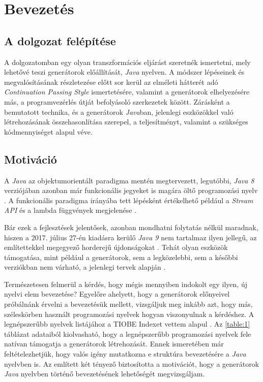 \chapter{Bevezetés}

\section{A dolgozat felépítése}

A dolgozatomban egy olyan transzformációs eljárást szeretnék ismertetni, mely lehetővé teszi generátorok előállítását, \textit{Java} nyelven. A módszer lépéseinek és megvalósításának részletezése előtt sor kerül az elméleti hátterét adó \textit{Continuation Passing Style} ismertetésére, valamint a generátorok elhelyezésére más, a programvezérlés útját befolyásoló szerkezetek között. Zárásként a bemutatott technika, és a generátorok \textit{Java}ban, jelenlegi eszközökkel való létrehozásának összehasonlítása szerepel, a teljesítményt, valamint a szükséges kódmennyiséget alapul véve.

\section{Motiváció}

A \textit{Java} az objektumorientált paradigma mentén megtervezett, legutóbbi, \textit{Java 8} verziójában azonban már funkcionális jegyeket is magára öltő programozási nyelv . A funkcionális paradigma irányába tett lépésként értékelhető például a \textit{Stream API} és a lambda függvények megjelenése \cite{Java8Features}. 

Bár ezek a fejlesztések jelentősek, azonban mondhatni folytatás nélkül maradnak, hiszen a 2017. július 27-én kiadásra kerülő \textit{Java 9} nem tartalmaz ilyen jellegű, az említettekkel megegyező horderejű újdonságokat \cite{Java9Features}. Tehát olyan eszközök támogatása, mint például a generátorok, sem a legközelebbi, sem a későbbi verziókban nem várható, a jelenlegi tervek alapján \cite{ProjectValhalla}.

Természetesen felmerül a kérdés, hogy mégis mennyiben indokolt egy ilyen, új nyelvi elem bevezetése? Egyelőre ahelyett, hogy a generátorok előnyeivel próbálnánk érvelni a bevezetésük mellett, vizsgáljuk meg inkább azt, hogy más, széleskörben használt programozási nyelvek hogyan viszonyulnak a kérdéshez. A legnépszerűbb nyelvek listájához a TIOBE Indexet vettem alapul \cite{TIOBEIndex}. Az \ref{table:1} táblázat adataiból kiolvasható, hogy a legnépszerűbb programozási nyelvek fele natívan támogatja a generátorok létrehozását. Ennek ismeretében már feltételezhetjük, hogy valós igény mutatkozna e struktúra bevezetésére a \textit{Java} nyelvben is. Az említett két tényező biztosította a motivációt, hogy a generátorok \textit{Java} nyelvben történő bevezetésének lehetőségét megvizsgáljam.

